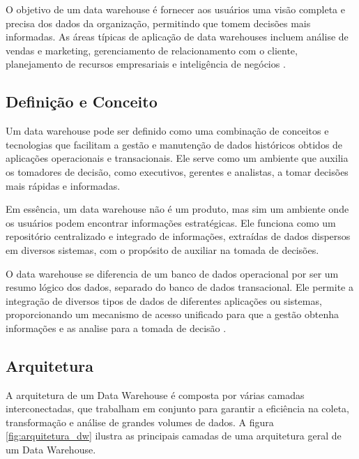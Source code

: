 O objetivo de um data warehouse é fornecer aos usuários uma visão completa e precisa dos dados da organização, permitindo 
que tomem decisões mais informadas. As áreas típicas de aplicação de data warehouses incluem análise de vendas e marketing, 
gerenciamento de relacionamento com o cliente, planejamento de recursos empresariais e inteligência de negócios \cite{nambiar2022overview, vaisman2014data}.

\subsection{Definição e Conceito}

Um data warehouse pode ser definido como uma combinação de conceitos e tecnologias que facilitam a gestão e manutenção 
de dados históricos obtidos de aplicações operacionais e transacionais. Ele serve como um ambiente que auxilia os tomadores 
de decisão, como executivos, gerentes e analistas, a tomar decisões mais rápidas e informadas.

Em essência, um data warehouse não é um produto, mas sim um ambiente onde os usuários podem encontrar informações estratégicas. 
Ele funciona como um repositório centralizado e integrado de informações, extraídas de dados dispersos em diversos sistemas, 
com o propósito de auxiliar na tomada de decisões.

O data warehouse se diferencia de um banco de dados operacional por ser um resumo lógico dos dados, separado do banco de 
dados transacional. Ele permite a integração de diversos tipos de dados de diferentes aplicações ou sistemas, proporcionando 
um mecanismo de acesso unificado para que a gestão obtenha informações e as analise para a tomada de decisão \cite{santoso2017data}. 

\subsection{Arquitetura}
A arquitetura de um Data Warehouse é composta por várias camadas interconectadas, que trabalham em conjunto para 
garantir a eficiência na coleta, transformação e análise de grandes volumes de dados. A figura \ref{fig:arquitetura_dw} ilustra as 
principais camadas de uma arquitetura geral de um Data Warehouse.

